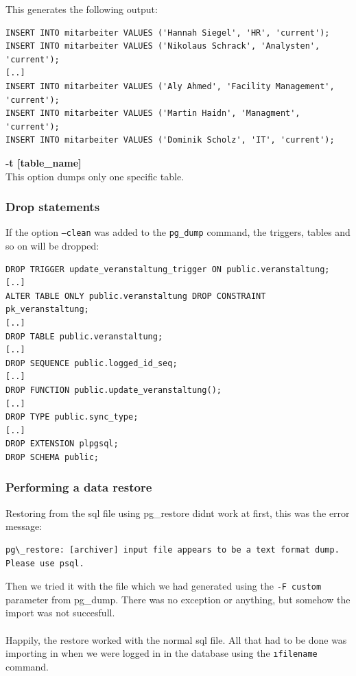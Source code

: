 \documentclass[10pt]{article}
\begin{document}
This generates the following output:
\begin{lstlisting}    
INSERT INTO mitarbeiter VALUES ('Hannah Siegel', 'HR', 'current');
INSERT INTO mitarbeiter VALUES ('Nikolaus Schrack', 'Analysten', 'current');
[..]
INSERT INTO mitarbeiter VALUES ('Aly Ahmed', 'Facility Management', 'current');
INSERT INTO mitarbeiter VALUES ('Martin Haidn', 'Managment', 'current');
INSERT INTO mitarbeiter VALUES ('Dominik Scholz', 'IT', 'current');
\end{lstlisting}    
\textbf{-t [table\_name]}\\
This option dumps only one specific table.
\subsubsection{Drop statements}
If the option \texttt{--clean} was added to the \texttt{pg\_dump} command, the triggers, tables and so on will be dropped:
\begin{lstlisting}    
DROP TRIGGER update_veranstaltung_trigger ON public.veranstaltung;
[..]
ALTER TABLE ONLY public.veranstaltung DROP CONSTRAINT pk_veranstaltung;
[..]
DROP TABLE public.veranstaltung;
[..]
DROP SEQUENCE public.logged_id_seq;
[..]
DROP FUNCTION public.update_veranstaltung();
[..]
DROP TYPE public.sync_type;
[..]
DROP EXTENSION plpgsql;
DROP SCHEMA public;
\end{lstlisting}    
\subsubsection{Performing a data restore}
Restoring from the sql file using pg\_restore didnt work at first, this was the error message:
\begin{lstlisting}    
pg\_restore: [archiver] input file appears to be a text format dump. Please use psql.
\end{lstlisting}    
Then we tried it with the file which we had generated using the \texttt{-F custom} parameter from pg\_dump.
There was no exception or anything, but somehow the import was not succesfull.
\\
\\
Happily, the restore worked with the normal sql file. All that had to be done was importing in when we were logged in in the database using the \texttt{\i filename} command.
\end{document}
